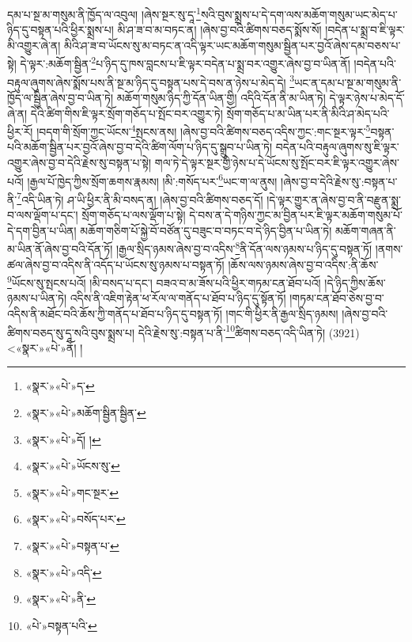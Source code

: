 དམ་པ་སྔ་མ་གསུམ་ནི་ཁྱོད་ལ་འབུལ། །ཞེས་སྔར་སུ་དཱ་\footnote{«སྣར་»«པེ་»ད་}སའི་བུས་སྨྲས་པ་དེ་དག་ལས་མཆོག་གསུམ་ཡང་མེད་པ་ཉིད་དུ་བསྟན་པའི་ཕྱིར་སྨྲས་པ། མི་ཤ་ཟ་བ་མ་བཏང་ན། །ཞེས་བྱ་བའི་ཚིགས་བཅད་སྨོས་སོ། །བདེན་པ་སྨྲ་བ་ཇི་ལྟར་མི་འགྱུར་ཞེ་ན། མིའི་ཤ་ཟ་བ་ཡོངས་སུ་མ་བཏང་ན་འདི་ལྟར་ཡང་མཆོག་གསུམ་སྦྱིན་པར་བྱའོ་ཞེས་དམ་བཅས་པ་སྟེ། དེ་ལྟར་:མཆོག་སྦྱིན་\footnote{«སྣར་»«པེ་»མཆོག་སྦྱིན་སྦྱིན་}པ་ཉིད་དུ་ཁས་བླངས་པ་ཇི་ལྟར་བདེན་པ་སྨྲ་བར་འགྱུར་ཞེས་བྱ་བ་ཡིན་ནོ། །བདེན་པའི་བརྟུལ་ཞུགས་ཞེས་སྨོས་པས་ནི་སྔ་མ་ཉིད་དུ་བསྟན་པས་དེ་བས་ན་ཉེས་པ་མེད་དེ། \footnote{«སྣར་»«པེ་»དོ། ། }ཡང་ན་དམ་པ་སྔ་མ་གསུམ་ནི་ཁྱོད་ལ་སྦྱིན་ཞེས་བྱ་བ་ཡིན་ཏེ། མཆོག་གསུམ་ཉིད་ཀྱི་དོན་ཡིན་གྱི། འདིའི་དོན་ནི་མ་ཡིན་ཏེ། དེ་ལྟར་ཉེས་པ་མེད་དོ་ཞེ་ན། དེའི་ཚིག་གིས་ཇི་ལྟར་སྲོག་གཅོད་པ་སྤོང་བར་འགྱུར་ཏེ། སྲོག་གཅོད་པ་མ་ཡིན་པར་ནི་མིའི་ཤ་མེད་པའི་ཕྱིར་རོ། །བདག་གི་སྲོག་ཀྱང་ཡོངས་\footnote{«སྣར་»«པེ་»ཡོངས་སུ་}སྤངས་ནས། །ཞེས་བྱ་བའི་ཚིགས་བཅད་འདིས་ཀྱང་:གང་སྔར་ལྟར་\footnote{«སྣར་»«པེ་»གང་སྔར་}བསྟན་པའི་མཆོག་སྦྱིན་པར་བྱའོ་ཞེས་བྱ་བ་དེའི་ཚིག་ལོག་པ་ཉིད་དུ་སྒྲུབ་པ་ཡིན་ཏེ། བདེན་པའི་བརྟུལ་ཞུགས་སུ་ཇི་ལྟར་འགྱུར་ཞེས་བྱ་བ་དེའི་རྗེས་སུ་བསྟན་པ་སྟེ། གལ་ཏེ་དེ་ལྟར་སྔར་གྱི་ཉེས་པ་དེ་ཡོངས་སུ་སྤོང་བར་ཇི་ལྟར་འགྱུར་ཞེས་པའོ། །རྒྱལ་པོ་ཁྱེད་ཀྱིས་སྲོག་ཆགས་རྣམས། །མི་:གསོད་པར་\footnote{«སྣར་»«པེ་»བསོད་པར་}ཡང་ག་ལ་ནུས། །ཞེས་བྱ་བ་དེའི་རྗེས་སུ་:བསྟན་པ་ནི་\footnote{«སྣར་»«པེ་»བསྟན་པ་}འདི་ཡིན་ཏེ། ཤ་ཡི་ཕྱིར་ནི་མི་བསད་ན། །ཞེས་བྱ་བའི་ཚིགས་བཅད་དོ། །དེ་ལྟར་གྱུར་ན་ཞེས་བྱ་བ་ནི་བརྫུན་སྨྲ་བ་ལས་ལྡོག་པ་དང་། སྲོག་གཅོད་པ་ལས་ལྡོག་པ་སྟེ། དེ་བས་ན་དེ་གཉིས་ཀྱང་མ་བྱིན་པར་ཇི་ལྟར་མཆོག་གསུམ་པོ་དེ་དག་བྱིན་པ་ཡིན། མཆོག་གཅིག་པོ་སྐྱེ་བོ་བཙོན་དུ་བཟུང་བ་བཏང་བ་དེ་ཉིད་བྱིན་པ་ཡིན་ཏེ། མཆོག་གཞན་ནི་མ་ཡིན་ནོ་ཞེས་བྱ་བའི་དོན་ཏོ། །རྒྱལ་སྲིད་ཉམས་ཞེས་བྱ་བ་འདིས་\footnote{«སྣར་»«པེ་»འདི་}ནི་དོན་ལས་ཉམས་པ་ཉིད་དུ་བསྟན་ཏོ། །ནགས་ཚལ་ཞེས་བྱ་བ་འདིས་ནི་འདོད་པ་ཡོངས་སུ་ཉམས་པ་བསྟན་ཏོ། །ཆོས་ལས་ཉམས་ཞེས་བྱ་བ་འདིས་:ནི་ཆོས་\footnote{«སྣར་»«པེ་»ནི་}ཡོངས་སུ་སྤངས་པའོ། །མི་བསད་པ་དང་། བཟའ་བ་མ་ཟོས་པའི་ཕྱིར་གཏམ་ངན་ཐོབ་པའོ། །དེ་ཉིད་ཀྱིས་ཆོས་ཉམས་པ་ཡིན་ཏེ། འདིས་ནི་འཇིག་རྟེན་ཕ་རོལ་ལ་གནོད་པ་ཐོབ་པ་ཉིད་དུ་སྟོན་ཏོ། །གཏམ་ངན་ཐོབ་ཅེས་བྱ་བ་འདིས་ནི་མཐོང་བའི་ཆོས་ཀྱི་གནོད་པ་ཐོབ་པ་ཉིད་དུ་བསྟན་ཏོ། །གང་གི་ཕྱིར་ནི་རྒྱལ་སྲིད་ཉམས། །ཞེས་བྱ་བའི་ཚིགས་བཅད་སུ་དཱ་སའི་བུས་སྨྲས་པ། དེའི་རྗེས་སུ་:བསྟན་པ་ནི་\footnote{«པེ་»བསྟན་པའི་}ཚིགས་བཅད་འདི་ཡིན་ཏེ། (3921) <«སྣར་»«པེ་»ནོ། །
